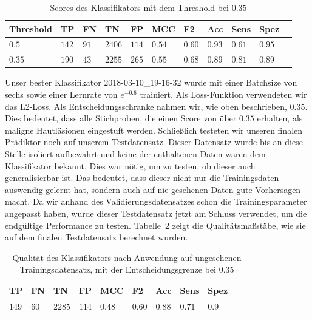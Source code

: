 \begin{table}[htb!]
\begin{center}
\begin{tabular}{lllllllllll}
	\toprule
 	Threshold  & TP & FN & TN & FP & MCC & F2 & Acc & Sens & Spez\\
	\midrule
    $0.5$ & $142$&	$91$ &	$2406$ &	$114$ &	$0.54$ 	&$0.60$	&$0.93$	&$0.61$&	$0.95$ \\
	$0.35$ & $190$ & $43$ &	$2255$ &	$265$ &	$0.55$ &	$0.68$&	$0.89$ &	$0.81$ & $0.89$\\
 \bottomrule
 \end{tabular}
 \end{center}
  \caption{Scores des Klassifikators mit dem Threshold bei $0.35$}
 \label{tab:final_scores}
 \end{table}

Unser bester Klassifikator 2018-03-10\_19-16-32 wurde mit einer Batchsize von sechs sowie einer Lernrate von $e^{-0.6}$ trainiert. Als Loss-Funktion verwendeten wir das L2-Loss. Als Entscheidungsschranke nahmen wir, wie oben beschrieben, $0.35$. Dies bedeutet, dass alle Stichproben, die einen Score von über $0.35$ erhalten, als maligne Hautläsionen eingestuft werden. Schließlich testeten wir unseren finalen Prädiktor noch auf unserem Testdatensatz. Dieser Datensatz wurde bis an diese Stelle isoliert aufbewahrt und keine der enthaltenen Daten waren dem Klassifikator bekannt. Dies war nötig, um zu testen, ob dieser auch generalisierbar ist. Das bedeutet, dass dieser nicht nur die Trainingsdaten auswendig gelernt hat, sondern auch auf nie gesehenen Daten gute Vorhersagen macht. Da wir anhand des Validierungsdatensatzes schon die Trainingsparameter angepasst haben, wurde dieser Testdatensatz jetzt am Schluss verwendet, um die endgültige Performance zu testen. Tabelle~\ref{tab:test_scores} zeigt die Qualitätsmaßstäbe, wie sie auf dem finalen Testdatensatz berechnet wurden.

\begin{table}[htb!]
\begin{center}
\begin{tabular}{lllllllllll}
	\toprule
 	TP & FN & TN & FP & MCC & F2 & Acc & Sens & Spez\\
	\midrule
    $149$&	$60$ &	$2285$ &	$114$ &	$0.48$ 	&$0.60$	&$0.88$	&$0.71$&	$0.9$ \\
 \bottomrule
 \end{tabular}
 \end{center}
  \caption{Qualität des Klassifikators nach Anwendung auf ungesehenen Trainingsdatensatz, mit der Entscheidungsgrenze bei $0.35$}
 \label{tab:test_scores}
 \end{table}

